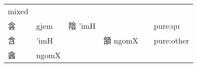 \documentclass[14pt,a4paper]{scrartcl}
\begin{document}
\begin{longtable}[c]{@{}llllll@{}}
\begin{minipage}[t]{0.14\columnwidth}
mixed
\strut\end{minipage}\tabularnewline
\begin{minipage}[t]{0.14\columnwidth}\raggedright\strut
侌
\strut\end{minipage} &
\begin{minipage}[t]{0.14\columnwidth}\raggedright\strut
gjem
\strut\end{minipage} &
\begin{minipage}[t]{0.14\columnwidth}\raggedright\strut
陰 'imH
\strut\end{minipage} &
\begin{minipage}[t]{0.14\columnwidth}\raggedright\strut
\strut\end{minipage} &
\begin{minipage}[t]{0.14\columnwidth}\raggedright\strut
\strut\end{minipage} &
\begin{minipage}[t]{0.14\columnwidth}\raggedright\strut
pure:qu
\strut\end{minipage}\tabularnewline
\begin{minipage}[t]{0.14\columnwidth}\raggedright\strut
含
\strut\end{minipage} &
\begin{minipage}[t]{0.14\columnwidth}\raggedright\strut
'imH
\strut\end{minipage} &
\begin{minipage}[t]{0.14\columnwidth}\raggedright\strut
\strut\end{minipage} &
\begin{minipage}[t]{0.14\columnwidth}\raggedright\strut
頷 ngomX
\strut\end{minipage} &
\begin{minipage}[t]{0.14\columnwidth}\raggedright\strut
\strut\end{minipage} &
\begin{minipage}[t]{0.14\columnwidth}\raggedright\strut
pure:other
\strut\end{minipage}\tabularnewline
\begin{minipage}[t]{0.14\columnwidth}\raggedright\strut
酓
\strut\end{minipage} &
\begin{minipage}[t]{0.14\columnwidth}\raggedright\strut
ngomX
\strut\end{minipage} &
\begin{minipage}[t]{0.14\columnwidth}\raggedright\strut
\strut\end{minipage} &
\begin{minipage}[t]{0.14\columnwidth}\raggedright\strut

\end{minipage}
\end{longtable}
\end{document}
